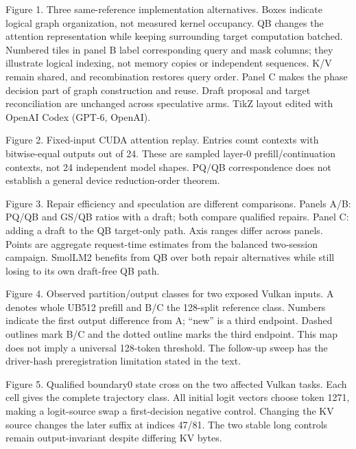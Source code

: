 Figure 1. Three same-reference implementation alternatives. Boxes indicate logical graph organization, not measured kernel occupancy. QB changes the attention representation while keeping surrounding target computation batched. Numbered tiles in panel B label corresponding query and mask columns; they illustrate logical indexing, not memory copies or independent sequences. K/V remain shared, and recombination restores query order. Panel C makes the phase decision part of graph construction and reuse. Draft proposal and target reconciliation are unchanged across speculative arms. TikZ layout edited with OpenAI Codex (GPT-6, OpenAI).

Figure 2. Fixed-input CUDA attention replay. Entries count contexts with bitwise-equal outputs out of 24. These are sampled layer-0 prefill/continuation contexts, not 24 independent model shapes. PQ/QB correspondence does not establish a general device reduction-order theorem.

Figure 3. Repair efficiency and speculation are different comparisons. Panels A/B: PQ/QB and GS/QB ratios with a draft; both compare qualified repairs. Panel C: adding a draft to the QB target-only path. Axis ranges differ across panels. Points are aggregate request-time estimates from the balanced two-session campaign. SmolLM2 benefits from QB over both repair alternatives while still losing to its own draft-free QB path.

Figure 4. Observed partition/output classes for two exposed Vulkan inputs. A denotes whole UB512 prefill and B/C the 128-split reference class. Numbers indicate the first output difference from A; ``new'' is a third endpoint. Dashed outlines mark B/C and the dotted outline marks the third endpoint. This map does not imply a universal 128-token threshold. The follow-up sweep has the driver-hash preregistration limitation stated in the text.

Figure 5. Qualified boundary0 state cross on the two affected Vulkan tasks. Each cell gives the complete trajectory class. All initial logit vectors choose token 1271, making a logit-source swap a first-decision negative control. Changing the KV source changes the later suffix at indices 47/81. The two stable long controls remain output-invariant despite differing KV bytes.

